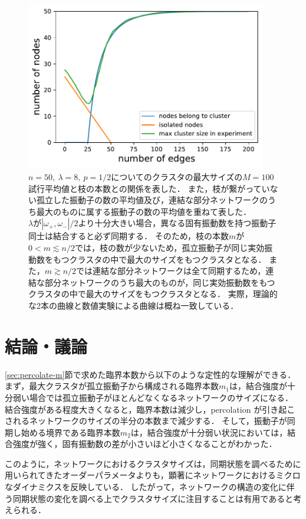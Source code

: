 \documentclass[../main]{subfiles}
\begin{document}
\begin{figure}[tbp]
\centering
\includegraphics[width=105mm]{./images/edge-finite-maxsize-delta000038000-compare.pdf}
\centering
\caption{$n=50,\ \lambda=8,\ p=1/2$についてのクラスタの最大サイズの$M=100$試行平均値と枝の本数との関係を表した．
また，枝が繋がっていない孤立した振動子の数の平均値及び，連結な部分ネットワークのうち最大のものに属する振動子の数の平均値を重ねて表した．\\
$\lambda$が$|\omega_+,\omega_-|/2$より十分大きい場合，異なる固有振動数を持つ振動子同士は結合すると必ず同期する．
そのため，枝の本数$m$が$0<m\lesssim n/2$では，枝の数が少ないため，孤立振動子が同じ実効振動数をもつクラスタの中で最大のサイズをもつクラスタとなる．
また，$m\gtrsim n/2$では連結な部分ネットワークは全て同期するため，連結な部分ネットワークのうち最大のものが，同じ実効振動数をもつクラスタの中で最大のサイズをもつクラスタとなる．
実際，理論的な2本の曲線と数値実験による曲線は概ね一致している．}
\label{fig:edge-cutting-K8-maxsize}
\end{figure}

\section{結論・議論}
\ref{sec:percolate-m}節で求めた臨界本数から以下のような定性的な理解ができる．
まず，最大クラスタが孤立振動子から構成される臨界本数$m_1$は，結合強度が十分弱い場合では孤立振動子がほとんどなくなるネットワークのサイズになる．
結合強度がある程度大きくなると，臨界本数は減少し，percolation が引き起こされるネットワークのサイズの半分の本数まで減少する．
そして，振動子が同期し始める境界である臨界本数$m_2$は，結合強度が十分弱い状況においては，結合強度が強く，固有振動数の差が小さいほど小さくなることがわかった．

このように，ネットワークにおけるクラスタサイズは，同期状態を調べるために用いられてきたオーダーパラメータよりも，顕著にネットワークにおけるミクロなダイナミクスを反映している．
したがって，ネットワークの構造の変化に伴う同期状態の変化を調べる上でクラスタサイズに注目することは有用であると考えられる．
\end{document}
